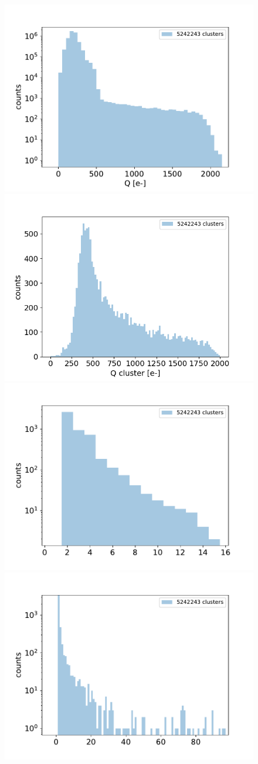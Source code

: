        \begin{figure}
          \centering
          \includegraphics[width=.49\linewidth]{figures/test_beam/MIP/all_evts.pdf}
          \includegraphics[width=.49\linewidth]{figures/test_beam/MIP/only_evts_with_cluster.pdf}\\   
          \includegraphics[width=.49\linewidth]{figures/test_beam/MIP/hits_per_cluster.pdf}
          \includegraphics[width=.49\linewidth]{figures/test_beam/MIP/cluster_dimension.pdf} 
          \caption{}
          \label{fig:}
       \end{figure}   
   

